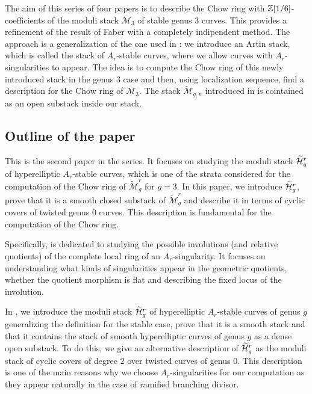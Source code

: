 \documentclass{alggeom}
\numberwithin{equation}{section}
\numberwithin{subsection}{section}
\theoremstyle{definition}
\theoremstyle{remark}
\newcommand\cM{\mathcal{M}} \newcommand\cN{\mathcal{N}}
\newcommand{\Mbar}{\overline{\cM}}
\newcommand{\Mtilde}{\widetilde{\mathcal M}}
\newcommand{\Htilde}{\widetilde{\cH}}
\begin{document}
The aim of this series of four papers is to describe the Chow ring with $\mathbb{Z}[1/6]$-coefficients of the moduli stack $\Mbar_3$ of stable genus $3$ curves. This provides a refinement of the result of Faber with a completely indipendent method. The approach is a generalization of the one used in \cite{DiLorPerVis}: we introduce an Artin stack, which is called the stack of $A_r$-stable curves, where we allow curves with $A_r$-singularities to appear. The idea is to compute the Chow ring of this newly introduced stack in the genus $3$ case and then, using localization sequence, find a description for the Chow ring of $\Mbar_3$. The stack $\Mtilde_{g,n}$ introduced in \cite{DiLorPerVis} is cointained as an open substack inside our stack. 

\subsection*{Outline of the paper}

This is the second paper in the series. It focuses on studying the moduli stack $\Htilde_g^r$ of hyperelliptic $A_r$-stable curves, which is one of the strata considered for the computation of the Chow ring of $\Mtilde_g^r$ for $g=3$. In this paper, we introduce $\Htilde_g^r$, prove that it is a smooth closed substack of $\Mtilde_g^r$ and describe it in terms of cyclic covers of twisted genus $0$ curves. This description is fundamental for the computation of the Chow ring.

Specifically,  is dedicated to studying the possible involutions (and relative quotients) of the complete local ring of an  $A_r$-singularity. It focuses on understanding what kinds of singularities appear in the geometric quotients, whether the quotient morphism is flat and describing the fixed locus of the involution.

In , we introduce the moduli stack $\Htilde_g^r$ of hyperelliptic $A_r$-stable curves of genus $g$ generalizing the definition for the stable case, prove that it is a smooth stack and that it contains the stack of smooth hyperelliptic curves of genus $g$ as a dense open substack. To do this, we give an alternative description of $\Htilde_g^r$ as the moduli stack of cyclic covers of degree $2$ over twisted curves of genus $0$. This description is one of the main reasons why we choose $A_r$-singularities for our computation as they appear naturally in the case of ramified branching divisor.
\end{document}
